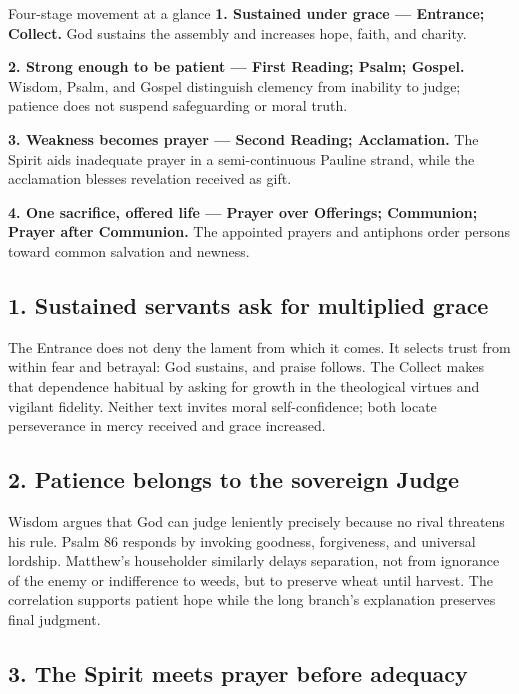 \begin{deepstudy}
\begin{studybox}{Four-stage movement at a glance}
\textbf{1. Sustained under grace --- Entrance; Collect.} God sustains the assembly and increases hope, faith, and charity.\par\smallskip
\textbf{2. Strong enough to be patient --- First Reading; Psalm; Gospel.} Wisdom, Psalm, and Gospel distinguish clemency from inability to judge; patience does not suspend safeguarding or moral truth.\par\smallskip
\textbf{3. Weakness becomes prayer --- Second Reading; Acclamation.} The Spirit aids inadequate prayer in a semi-continuous Pauline strand, while the acclamation blesses revelation received as gift.\par\smallskip
\textbf{4. One sacrifice, offered life --- Prayer over Offerings; Communion; Prayer after Communion.} The appointed prayers and antiphons order persons toward common salvation and newness.
\end{studybox}

\subsection*{1. Sustained servants ask for multiplied grace\enspace{}}

The Entrance does not deny the lament from which it comes. It selects trust from within fear and betrayal: God sustains, and praise follows. The Collect makes that dependence habitual by asking for growth in the theological virtues and vigilant fidelity. Neither text invites moral self-confidence; both locate perseverance in mercy received and grace increased.

\subsection*{2. Patience belongs to the sovereign Judge\enspace{}}

Wisdom argues that God can judge leniently precisely because no rival threatens his rule. Psalm 86 responds by invoking goodness, forgiveness, and universal lordship. Matthew's householder similarly delays separation, not from ignorance of the enemy or indifference to weeds, but to preserve wheat until harvest. The correlation supports patient hope while the long branch's explanation preserves final judgment.

\subsection*{3. The Spirit meets prayer before adequacy\enspace{}}


\end{deepstudy}
